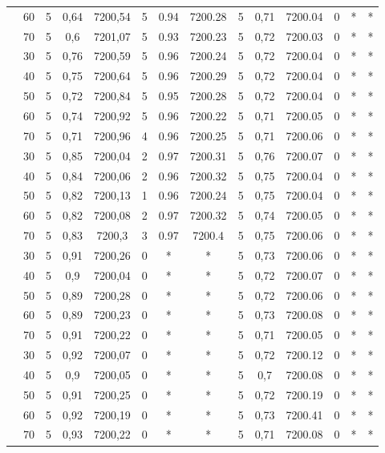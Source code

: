 \begin{table}[!h]
\begin{tabular}{|c|c|c c c c c c|c c c c c c|}
& 60 & 5 & 0,64 & 7200,54 &	5 &	0.94 & 7200.28 & 5 & 0,71 &	7200.04 & 0 & * & *\\
& 70 & 5 & 0,6 &  7201,07 &	5 &	0.93 & 7200.23 & 5 & 0,72 &	7200.03 & 0 & * & *\\
\hline
\multirow{5}{*}{\midrule 12} 
& 30 &	5 &	0,76 &	7200,59 &	5 &	 0.96 &	7200.24 &	5 &	0,72 &	7200.04 &	0 &	* &	*\\
& 40 &	5 &	0,75 &	7200,64 &	5 &	0.96 &	7200.29 &	5 &	0,72 &	7200.04 &	0 &	* &	*\\
& 50 &	5 &	0,72 &	7200,84 &	5 &	0.95 &	7200.28 &	5 &	0,72 &	7200.04 &	0 &	* &	*\\
& 60 &	5 &	0,74 &	7200,92 &	5 &	0.96 &	7200.22 &	5 &	0,71 &	7200.05 &	0 &	* &	*\\
& 70 &	5 &	0,71 &	7200,96 &	4 &	0.96 &	7200.25 &	5 &	0,71 &	7200.06 &	0 &	* &	*\\
\hline\multirow{5}{*}{\midrule 13} 
& 30 & 5 &0,85 & 7200,04 &	2 &	0.97 &	7200.31 &	5 &	0,76 &	7200.07 &	0 &	* &	*\\
& 40 & 5 &0,84 & 7200,06 &	2 &	0.96 &	7200.32 &	5 &	0,75 &	7200.04 &	0 &	* &	*\\
& 50 & 5 &0,82 & 7200,13 &	1 &	0.96 &	7200.24 &	5 &	0,75 &	7200.04 &	0 &	* &	*\\
& 60 & 5 &0,82 & 7200,08 &	2 &	0.97 &	7200.32 &	5 &	0,74 &	7200.05 &	0 &	* &	*\\
& 70 & 5 &0,83 & 7200,3  &	3 &	0.97 &	7200.4  &	5 &	0,75 &	7200.06 &	0 &	* &	*\\
\hline\multirow{5}{*}{\midrule 14} 
& 30 &	5 &	0,91 &	7200,26 &	0 &	* &	* &	5 &	0,73 &	7200.06 &	0 &	* &	*\\
& 40 &	5 &	0,9  &	7200,04 &	0 &	* &	* &	5 &	0,72 &	7200.07 &	0 &	* & *\\
& 50 &	5 &	0,89 &	7200,28 &	0 &	* &	* &	5 &	0,72 &	7200.06 &	0 &	* &	*\\
& 60 &	5 &	0,89 &	7200,23 &	0 &	* &	* &	5 &	0,73 &	7200.08 &	0 &	* &	*\\
& 70 &	5 &	0,91 &	7200,22 &	0 &	* &	* &	5 &	0,71 &	7200.05 &	0 &	* &	*\\
\hline
\multirow{5}{*}{\midrule 15} 
& 30 &	5 &	0,92 &	7200,07 &	0 &	* &	* &	5 &	0,72 &	7200.12 &	0 &	* &	*\\
& 40 &	5 &	0,9  &	7200,05 &	0 &	* &	* &	5 &	0,7 &	7200.08 &	0 &	* &	*\\
& 50 &	5 &	0,91 &	7200,25 &	0 &	* &	* &	5 &	0,72 &	7200.19 &	0 &	* &	*\\
& 60 &	5 &	0,92 &	7200,19 &	0 &	* &	* &	5 &	0,73 &	7200.41 &	0 &	* &	*\\
& 70 &	5 &	0,93 &	7200,22 &	0 &	* &	* &	5 &	0,71 &	7200.08 &	0 &	* &	*\\
\hline
\end{tabular}
\label{table:tab1}
\end{table}


